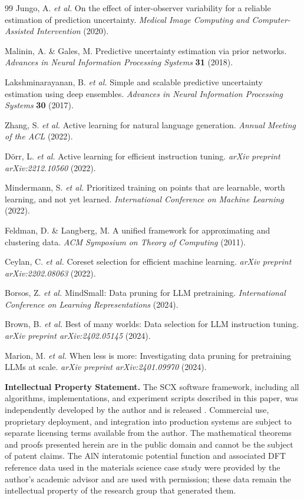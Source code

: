 \documentclass[11pt,twocolumn]{article}
\begin{document}
\begin{thebibliography}{99}
Jungo, A. \textit{et al.} On the effect of inter-observer variability for a reliable estimation of prediction uncertainty. \textit{Medical Image Computing and Computer-Assisted Intervention} (2020).

Malinin, A. \& Gales, M. Predictive uncertainty estimation via prior networks. \textit{Advances in Neural Information Processing Systems} \textbf{31} (2018).

Lakshminarayanan, B. \textit{et al.} Simple and scalable predictive uncertainty estimation using deep ensembles. \textit{Advances in Neural Information Processing Systems} \textbf{30} (2017).

Zhang, S. \textit{et al.} Active learning for natural language generation. \textit{Annual Meeting of the ACL} (2022).

D\"orr, L. \textit{et al.} Active learning for efficient instruction tuning. \textit{arXiv preprint arXiv:2212.10560} (2022).

Mindermann, S. \textit{et al.} Prioritized training on points that are learnable, worth learning, and not yet learned. \textit{International Conference on Machine Learning} (2022).

Feldman, D. \& Langberg, M. A unified framework for approximating and clustering data. \textit{ACM Symposium on Theory of Computing} (2011).

Ceylan, C. \textit{et al.} Coreset selection for efficient machine learning. \textit{arXiv preprint arXiv:2202.08063} (2022).

Borsos, Z. \textit{et al.} MindSmall: Data pruning for LLM pretraining. \textit{International Conference on Learning Representations} (2024).

Brown, B. \textit{et al.} Best of many worlds: Data selection for LLM instruction tuning. \textit{arXiv preprint arXiv:2402.05145} (2024).

Marion, M. \textit{et al.} When less is more: Investigating data pruning for pretraining LLMs at scale. \textit{arXiv preprint arXiv:2401.09970} (2024).

\end{thebibliography}

\textbf{Intellectual Property Statement.}
The SCX software framework, including all algorithms, implementations, and experiment scripts described in this paper, was independently developed by the author and is released . Commercial use, proprietary deployment, and integration into production systems are subject to separate licensing terms available from the author. The mathematical theorems and proofs presented herein are in the public domain and cannot be the subject of patent claims. The AlN interatomic potential function and associated DFT reference data used in the materials science case study were provided by the author's academic advisor and are used with permission; these data remain the intellectual property of the research group that generated them.
\end{document}
